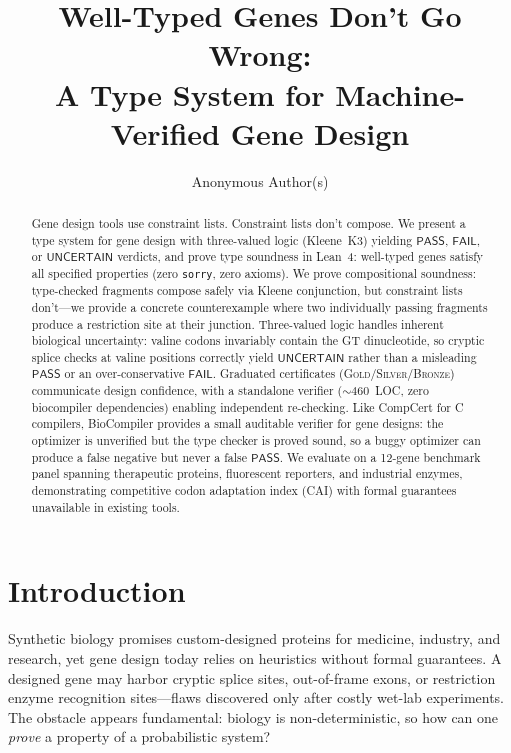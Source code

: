 \documentclass[runningheads]{llncs}
\title{Well-Typed Genes Don't Go Wrong:\\A Type System for Machine-Verified Gene Design}
\author{Anonymous Author(s)}
\institute{Anonymous Institution}
\newcommand{\PASS}{\ensuremath{\mathsf{PASS}}\xspace}
\newcommand{\FAIL}{\ensuremath{\mathsf{FAIL}}\xspace}
\newcommand{\UNCERTAIN}{\ensuremath{\mathsf{UNCERTAIN}}\xspace}
\newcommand{\GOLD}{\textsc{Gold}\xspace}
\newcommand{\SILVER}{\textsc{Silver}\xspace}
\newcommand{\BRONZE}{\textsc{Bronze}\xspace}
\begin{document}
\maketitle

\begin{abstract}
Gene design tools use constraint lists.
Constraint lists don't compose.
We present a type system for gene design with three-valued logic
(Kleene~K3) yielding \PASS, \FAIL, or \UNCERTAIN{} verdicts, and prove
type soundness in Lean~4: well-typed genes satisfy all specified
properties (zero \texttt{sorry}, zero axioms).
We prove compositional soundness: type-checked fragments compose
safely via Kleene conjunction, but constraint lists don't---we provide
a concrete counterexample where two individually passing fragments
produce a restriction site at their junction.
Three-valued logic handles inherent biological uncertainty: valine
codons invariably contain the GT dinucleotide, so cryptic splice
checks at valine positions correctly yield \UNCERTAIN{} rather than a
misleading \PASS{} or an over-conservative \FAIL.
Graduated certificates (\GOLD/\SILVER/\BRONZE) communicate design
confidence, with a standalone verifier (${\sim}460$~LOC, zero
biocompiler dependencies) enabling independent re-checking.
Like CompCert for C compilers, BioCompiler provides a small auditable
verifier for gene designs: the optimizer is unverified but the type
checker is proved sound, so a buggy optimizer can produce a false
negative but never a false \PASS.
We evaluate on a 12-gene benchmark panel spanning therapeutic
proteins, fluorescent reporters, and industrial enzymes,
demonstrating competitive codon adaptation index (CAI) with formal
guarantees unavailable in existing tools.
\end{abstract}

\section{Introduction}\label{sec:intro}

Synthetic biology promises custom-designed proteins for medicine,
industry, and research, yet gene design today relies on heuristics
without formal guarantees.
A designed gene may harbor cryptic splice sites, out-of-frame exons, or
restriction enzyme recognition sites---flaws discovered only after
costly wet-lab experiments.
The obstacle appears fundamental: biology is non-deterministic, so how
can one \emph{prove} a property of a probabilistic system?
\end{document}
